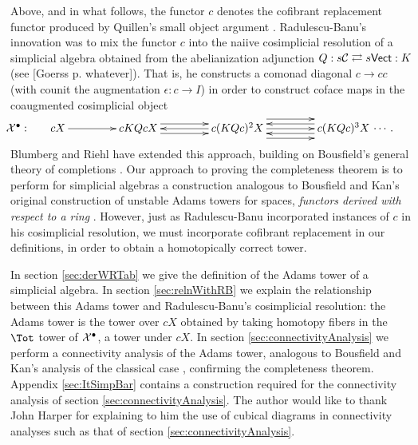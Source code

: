 \documentclass[11pt]{amsart}
\theoremstyle{plain}
\begin{document}
Above, and in what follows, the functor $c$ denotes the cofibrant replacement functor produced by Quillen's small object argument \cite{QuillenHomAlg.pdf}. Radulescu-Banu's innovation was to mix the functor $c$ into the naiive cosimplicial resolution of a simplicial algebra obtained from the abelianization adjunction $Q:s\mathcal{C}\rightleftarrows s\mathsf{Vect}:K$ (see [Goerss p. whatever]). That is, he constructs a comonad diagonal $c\to cc$ (with counit the augmentation $\epsilon: c\to I$) in order to construct coface maps in the coaugmented cosimplicial object
\[\makebox[0cm][r]{\,$\calX^\bullet:\qquad $}\vcenter{
\def\labelstyle{\scriptstyle}
\xymatrix@C=1.5cm@1{
cX\,
\ar[r]
&
\,cKQcX\,
\ar[r];[]
&
\,c(KQc)^2X\,
\ar@<-1ex>[l];[]
\ar@<+1ex>[l];[]
\ar@<+1ex>[r];[]
\ar@<-1ex>[r];[]
&
\,c(KQc)^3X\,\makebox[0cm][l]{\,$\cdots. $}
\ar[l];[]
\ar@<-2ex>[l];[]
\ar@<+2ex>[l];[]
}}\]
Blumberg and Riehl \cite{BlumRiehlResolutions.pdf} have extended this approach, building on Bousfield's general theory of completions \cite{BousCosimpResnHtpySS.pdf}. Our approach to proving the completeness theorem is to perform for simplicial algebras a construction analogous to Bousfield and Kan's original construction of unstable Adams towers for spaces, \emph{functors derived with respect to a ring} \cite{BK_pairings.pdf}. However, just as Radulescu-Banu incorporated instances of $c$ in his cosimplicial resolution, we must incorporate cofibrant replacement in our definitions, in order to obtain a homotopically correct tower.

In section \ref{sec:derWRTab} we give the definition of the Adams tower of a simplicial algebra.
In section \ref{sec:relnWithRB} we explain the relationship between this Adams tower and Radulescu-Banu's cosimplicial resolution: the Adams tower is the tower over $cX$ obtained by taking homotopy fibers in the $\Tot$ tower of $\mathcal{X}^\bullet$, a tower under $cX$. %
In section \ref{sec:connectivityAnalysis} we perform a connectivity analysis of the Adams tower, analogous to Bousfield and Kan's analysis of the classical case \cite{BK_pairings.pdf}, confirming the completeness theorem. Appendix \ref{sec:ItSimpBar} contains a construction required for the connectivity analysis of section \ref{sec:connectivityAnalysis}.
The author would like to thank John Harper for explaining to him the use of cubical diagrams in connectivity analyses such as that of section \ref{sec:connectivityAnalysis}.
\end{document}
